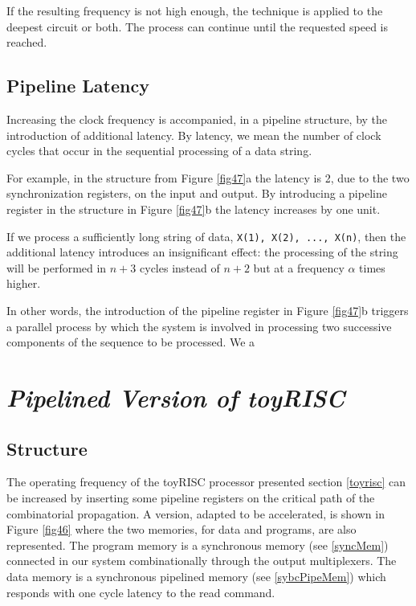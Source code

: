 If the resulting frequency is not high enough, the technique is applied to the deepest circuit or both. The process can continue until the requested speed is reached.

\subsection{Pipeline Latency}

Increasing the clock frequency is accompanied, in a pipeline structure, by the introduction of additional latency. By latency, we mean the number of clock cycles that occur in the sequential processing of a data string.

For example, in the structure from Figure \ref{fig47}a the latency is 2, due to the two synchronization registers, on the input and output. By introducing a pipeline register in the structure in Figure \ref{fig47}b the latency increases by one unit.

If we process a sufficiently long string of data, {\tt X(1), X(2), ..., X(n)}, then the additional latency introduces an insignificant effect: the processing of the string will be performed in $n+3$ cycles instead of $n+2$ but at a frequency $\alpha$ times higher.

In other words, the introduction of the pipeline register in Figure \ref{fig47}b triggers a parallel process by which the system is involved in processing two successive components of the sequence to be processed. We a


\section{{\bf {\em Pipelined Version of toyRISC}}}

\subsection{Structure}

The operating frequency of the toyRISC processor presented section \ref{toyrisc} can be increased by inserting some pipeline registers on the critical path of the combinatorial propagation. A version, adapted to be accelerated, is shown in Figure \ref{fig46} where the two memories, for data and programs, are also represented. The program memory is a synchronous memory (see \ref{syncMem}) connected in our system  combinationally  through the output multiplexers. The data memory is a synchronous pipelined memory (see \ref{sybcPipeMem}) which responds with one cycle latency to the read command.

